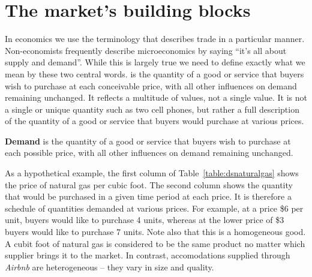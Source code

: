 \section{The market's building blocks}\label{sec:ch3sec2}

In economics we use the terminology that describes trade in a particular
manner. Non-economists frequently describe microeconomics by saying ``it's
all about supply and demand''. While this is largely true we need to define
exactly what we mean by these two central words.
 is the quantity of a good or service that buyers wish
to purchase at each conceivable price, with all other influences on demand
remaining unchanged. It reflects a multitude of values, not a single value.
It is not a single or unique quantity such as two cell phones, but rather a
full description of the quantity of a good or service that buyers would
purchase at various prices.

\begin{DefBox}
\textbf{Demand} is the quantity of a good or service that buyers wish to purchase at each possible price, with all other influences on demand remaining unchanged.
\end{DefBox}

\newhtmlpage

As a hypothetical example, the first column of Table~\ref{table:dsnaturalgas} shows the
price of natural gas per cubic foot. The second column shows the quantity
that would be purchased in a given time period at each price. It is
therefore a schedule of quantities demanded at various prices. For example, at a price \$6 per unit, buyers
would like to purchase 4 units, whereas at the lower price of \$3 buyers
would like to purchase 7 units. Note also that this is a homogeneous good. A
cubit foot of natural gas is considered to be the same product no matter
which supplier brings it to the market. In contrast, accomodations supplied
through \textit{Airbnb} are heterogeneous -- they vary in size and quality.

